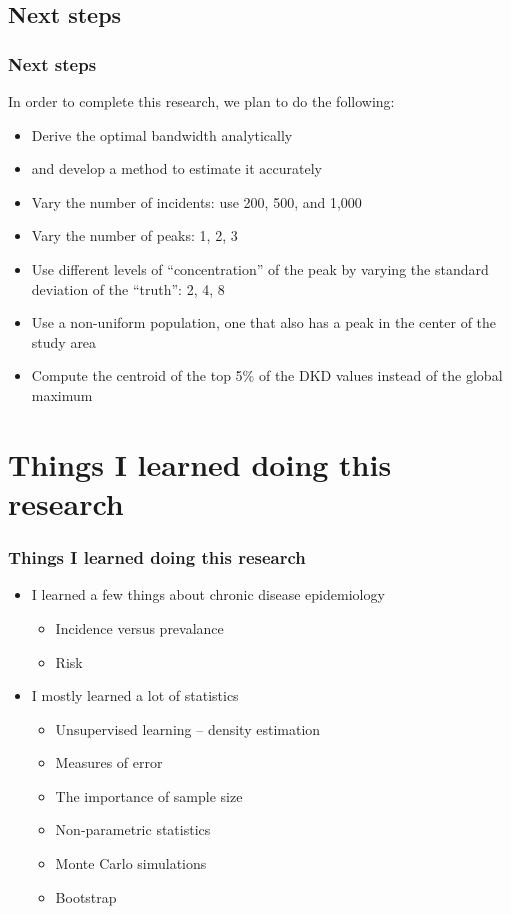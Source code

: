 \documentclass{beamer}
\theoremstyle{definition}
\begin{document}
\subsection{Next steps}
\begin{frame}\frametitle{Next steps}
    In order to complete this research, we plan to do the following:
    \begin{itemize}
        \item Derive the \alert{optimal bandwidth} analytically
        \item \textellipsis and develop a method to estimate it accurately
        \item Vary the number of incidents: use 200, 500, and 1,000
        \item Vary the number of peaks: 1, 2, 3
        \item Use different levels of ``concentration'' of the peak by varying the standard deviation of the ``truth'': 2, 4, 8
        \item Use a non-uniform population, one that also has a peak in the center of the study area
        \item Compute the centroid of the top 5\% of the DKD values instead of the global maximum
    \end{itemize}
\end{frame}

\section{Things I learned doing this research}

\begin{frame}\frametitle{Things I learned doing this research}
    \begin{itemize}
        \item I learned a few things about chronic disease epidemiology
        \begin{itemize}
            \item Incidence versus prevalance
            \item Risk
        \end{itemize}
        \item I mostly learned a lot of statistics
        \begin{itemize}
            \item Unsupervised learning -- density estimation
            \item Measures of error
            \item The importance of sample size
            \item Non-parametric statistics
            \item Monte Carlo simulations
            \item Bootstrap
        \end{itemize}
    \end{itemize}
\end{frame}
\end{document}
